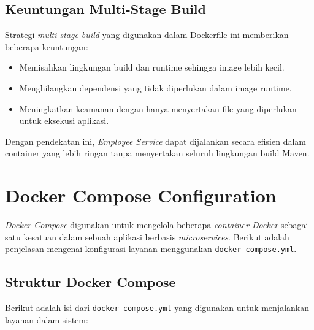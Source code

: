 \subsection{Keuntungan Multi-Stage Build}

Strategi \textit{multi-stage build} yang digunakan dalam Dockerfile ini memberikan beberapa keuntungan:
\begin{itemize}
	\item Memisahkan lingkungan build dan runtime sehingga image lebih kecil.
	\item Menghilangkan dependensi yang tidak diperlukan dalam image runtime.
	\item Meningkatkan keamanan dengan hanya menyertakan file yang diperlukan untuk eksekusi aplikasi.
\end{itemize}

Dengan pendekatan ini, \textit{Employee Service} dapat dijalankan secara efisien dalam container yang lebih ringan tanpa menyertakan seluruh lingkungan build Maven.


\section{Docker Compose Configuration}

\textit{Docker Compose} digunakan untuk mengelola beberapa \textit{container Docker} sebagai satu kesatuan dalam sebuah aplikasi berbasis \textit{microservices}. Berikut adalah penjelasan mengenai konfigurasi layanan menggunakan \texttt{docker-compose.yml}.

\subsection{Struktur Docker Compose}

Berikut adalah isi dari \texttt{docker-compose.yml} yang digunakan untuk menjalankan layanan dalam sistem:

